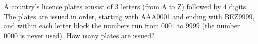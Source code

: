 A country's licence plates consist of $3$ letters (from A to Z) followed by $4$ digits. The plates are issued in order, starting with AAA0001 and ending with BEZ9999, and within each letter block the numbers run from $0001$ to $9999$ (the number $0000$ is never used). How many plates are issued?
